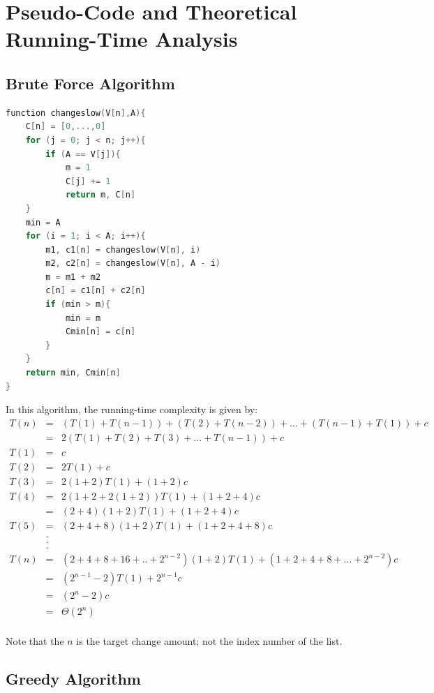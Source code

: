 \documentclass[11pt]{scrreprt}
\begin{document}
\section {Pseudo-Code and Theoretical Running-Time Analysis}


\subsection {Brute Force Algorithm}

\begin{lstlisting}[language=c]
function changeslow(V[n],A){
	C[n] = [0,...,0]
	for (j = 0; j < n; j++){
		if (A == V[j]){
			m = 1
			C[j] += 1
			return m, C[n]
	}
	min = A
	for (i = 1; i < A; i++){
		m1, c1[n] = changeslow(V[n], i)
		m2, c2[n] = changeslow(V[n], A - i)
		m = m1 + m2
		c[n] = c1[n] + c2[n]
		if (min > m){
			min = m
			Cmin[n] = c[n]
		}
	}
	return min, Cmin[n]
}
\end{lstlisting}

In this algorithm, the running-time complexity is given by:
\begin{eqnarray*}
T(n) 	& = & (T(1)+ T(n-1)) + (T(2) + T(n-2)) + ... + (T(n-1) + T(1)) + c\\
		& = & 2(T(1) + T(2) + T(3) + ... + T(n-1)) + c\\
T(1)	& = & c\\
T(2) 	& = & 2T(1) + c\\
T(3) 	& = & 2(1+2)T(1) + (1+2)c\\
T(4) 	& = & 2(1+2+2(1+2))T(1) + (1+2+4)c\\
	 	& = & (2+4)(1+2)T(1) + (1+2+4)c\\
T(5) 	& = & (2+4+8)(1+2)T(1) + (1+2+4+8)c\\
		& . & \\
		& . & \\
		& . & \\
T(n) 	& = & (2+4+8+16+..+2^{n-2})(1+2)T(1) + (1+2+4+8+...+2^{n-2})c\\
		& = & (2^{n-1}-2)T(1) + 2^{n-1}c\\
		& = & (2^n-2)c\\
		& = & \Theta(2^n)\\
\end{eqnarray*}

Note that the $n$ is the target change amount; not the index number of the list.

\subsection{Greedy Algorithm}
\end{document}

